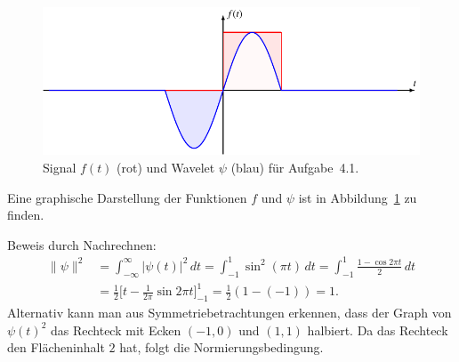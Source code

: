 \begin{loesung}
\begin{figure}
%
\includegraphics{chapters/uebungsaufgaben/04001-signal.pdf}
\caption{Signal $f(t)$ (rot) und Wavelet $\psi$ (blau) für Aufgabe~4.1.
\label{04001:funktionen}}
\end{figure}
Eine graphische Darstellung der Funktionen $f$ und $\psi$ ist in
Abbildung~\ref{04001:funktionen} zu finden.
\begin{teilaufgaben}
%
%
\item
Beweis durch Nachrechnen:
\begin{align*}
\|\psi\|^2
&=
\int_{-\infty}^\infty |\psi(t)|^2\,dt
=
\int_{-1}^1 \sin^2(\pi t)\,dt
=
\int_{-1}^1 \frac{1-\cos 2\pi t}{2}\,dt
\\
&=
\frac12\biggl[
t-\frac{1}{2\pi}\sin 2\pi t
\biggr]_{-1}^{1}
=\frac12(1-(-1))
=
1.
\end{align*}
Alternativ kann man aus Symmetriebetrachtungen erkennen, dass der Graph
von $\psi(t)^2$ das Rechteck mit Ecken $(-1,0)$ und $(1,1)$ halbiert.
Da das Rechteck den Flächeninhalt $2$ hat, folgt die Normierungsbedingung.
%

\end{teilaufgaben}
\end{loesung}
